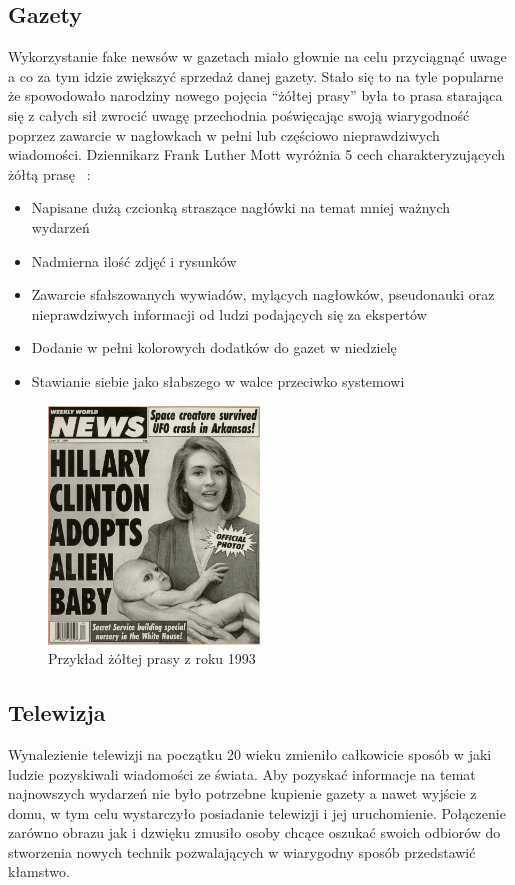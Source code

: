 \subsection{Gazety}
Wykorzystanie fake newsów w gazetach miało głownie na celu przyciągnąć uwage a co za 
tym idzie zwiększyć sprzedaż danej gazety. Stało się to na tyle popularne że spowodowało
narodziny nowego pojęcia ``żółtej prasy'' była to prasa starająca się z całych sił zwrocić
uwagę przechodnia poświęcając swoją wiarygodność poprzez zawarcie w nagłowkach w pełni lub
częściowo nieprawdziwych wiadomości. Dziennikarz Frank Luther Mott wyróżnia 5 cech charakteryzujących 
żółtą prasę ~\cite{YellowPressFrank}:
\begin{itemize}
    \item Napisane dużą czcionką straszące nagłówki na temat mniej ważnych wydarzeń
    \item Nadmierna ilość zdjęć i rysunków
    \item Zawarcie sfałszowanych wywiadów, mylących nagłowków, pseudonauki oraz nieprawdziwych informacji od ludzi podających się za ekspertów
    \item Dodanie w pełni kolorowych dodatków do gazet w niedzielę
    \item Stawianie siebie jako słabszego w walce przeciwko systemowi
\end{itemize}

\begin{figure}[h!]
    \centering
    \includegraphics[width=0.5\textwidth]{./Img/fake-newspaper.jpg}
    \caption{Przykład żółtej prasy z roku 1993}
\end{figure}

\subsection{Telewizja}
Wynalezienie telewizji na początku 20 wieku zmieniło całkowicie sposób w jaki ludzie pozyskiwali wiadomości ze świata.
Aby pozyskać informacje na temat najnowszych wydarzeń nie było potrzebne kupienie gazety a nawet 
wyjście z domu, w tym celu wystarczyło posiadanie telewizji i jej uruchomienie. Połączenie zarówno obrazu
jak i dzwięku zmusiło osoby chcące oszukać swoich odbiorów do stworzenia nowych technik 
pozwalających w wiarygodny sposób przedstawić kłamstwo.

